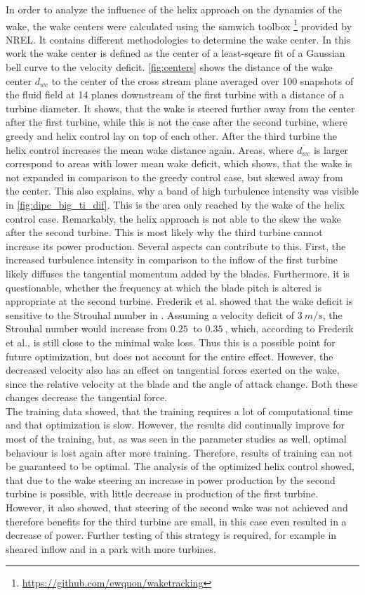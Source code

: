 In order to analyze the influence of the helix approach on the dynamics of the wake, the wake centers were calculated using the samwich toolbox \footnote{\url{https://github.com/ewquon/waketracking}} provided by NREL. It contains different methodologies to determine the wake center. In this work the wake center is defined as the center of a least-sqeare fit of a Gaussian bell curve to the velocity deficit. \autoref{fig:centers} shows the distance of the wake center $d_{wc}$ to the center of the cross stream plane averaged over 100 snapshots of the fluid field at 14 planes downstream of the first turbine with a distance of a turbine diameter. It shows, that the wake is steered further away from the center after the first turbine, while this is not the case after the second turbine, where greedy and helix control lay on top of each other. After the third turbine the helix control increases the mean wake distance again. Areas, where $\overline{d_{wc}}$ is larger correspond to areas with lower mean wake deficit, which shows, that the wake is not expanded in comparison to the greedy control case, but skewed away from the center. This also explains, why a band of high turbulence intensity was visible in \autoref{fig:dipc_big_ti_dif}. This is the area only reached by the wake of the helix control case. Remarkably, the helix approach is not able to the skew the wake after the second turbine. This is most likely why the third turbine cannot increase its power production. Several aspects can contribute to this. First, the increased turbulence intensity in comparison to the inflow of the first turbine likely diffuses the tangential momentum added by the blades. Furthermore, it is questionable, whether the frequency at which the blade pitch is altered is appropriate at the second turbine. Frederik et al. showed that the wake deficit is sensitive to the Strouhal number in \cite{frederik_helix_2020}. Assuming a velocity deficit of $\SI{3}{m/s}$, the Strouhal number would increase from $\SI{0.25}{}$ to $\SI{0.35}{}$, which, according to Frederik et al., is still close to the minimal wake loss. Thus this is a possible point for future optimization, but does not account for the entire effect. However, the decreased velocity also has an effect on tangential forces exerted on the wake, since the relative velocity at the blade and the angle of attack change. Both these changes decrease the tangential force. \\
The training data showed, that the training requires a lot of computational time and that optimization is slow. However, the results did continually improve for most of the training, but, as was seen in the parameter studies as well, optimal behaviour is lost again after more training. Therefore, results of training can not be guaranteed to be optimal. The analysis of the optimized helix control showed, that due to the wake steering an increase in power production by the second turbine is possible, with little decrease in production of the first turbine. However, it also showed, that steering of the second wake was not achieved and therefore benefits for the third turbine are small, in this case even resulted in a decrease of power. Further testing of this strategy is required, for example in sheared inflow and in a park with more turbines.
